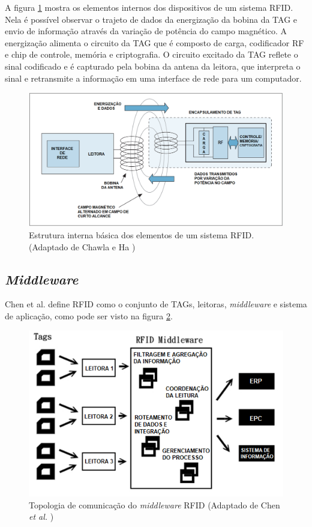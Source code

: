 A figura \ref{fig:DetalhesRFID} mostra os elementos internos dos dispositivos de um sistema RFID. Nela é possível observar o trajeto de dados da energização da bobina da TAG e envio de informação através da variação de potência do campo magnético. A energização alimenta o circuito da TAG que é composto de carga, codificador RF e chip de controle, memória e criptografia. O circuito excitado da TAG reflete o sinal codificado e é capturado pela bobina da antena da leitora, que interpreta o sinal e retransmite a informação em uma interface de rede para um computador.

\begin{figure}[H]
    \centering
    \includegraphics[width=0.8\linewidth]{figs/Fundamentos/RFIDdetails.png}
    \caption{Estrutura interna básica dos elementos de um sistema RFID. (Adaptado de Chawla e Ha \cite{chawla2007overview})}
    \label{fig:DetalhesRFID}
\end{figure}

\subsection{\textit{Middleware}} \label{section: middleware}

Chen et al. \cite{chenUsingRFID} define RFID como o conjunto de TAGs, leitoras, \textit{middleware} e sistema de aplicação, como pode ser visto na figura \ref{fig:RFID-Middleware}.

\begin{figure}[H]
    \centering
    \includegraphics[width=0.6\linewidth]{figs/Fundamentos/RFID.png}
    \caption{Topologia de comunicação do \textit{middleware} RFID (Adaptado de Chen \textit{et al.} \cite{chenUsingRFID})}
    \label{fig:RFID-Middleware}
\end{figure}

